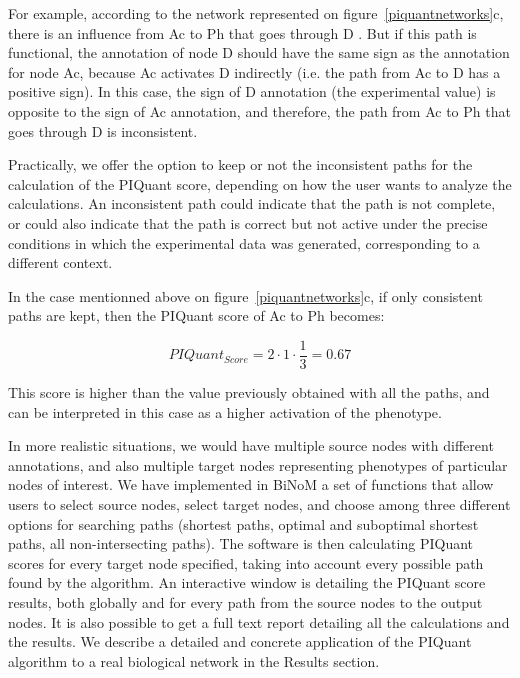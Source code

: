 \documentclass[10pt]{bmc_article}
\newenvironment{bmcformat}{\baselineskip20pt\sloppy\setboolean{publ}{false}}{\baselineskip20pt\sloppy}
\begin{document}
\begin{bmcformat}
For example, according to the network represented on figure~\ref{piquantnetworks}c, there is an influence from Ac to Ph
that goes through D . But if this path
is functional, the annotation of node D should have the same sign as the annotation for node Ac, because
Ac activates D indirectly (i.e. the path from Ac to D has a positive sign). In this case, the sign of D annotation (the experimental value) is opposite to
the sign of Ac annotation, and therefore, the path from Ac to Ph that goes through D is inconsistent.

Practically, we offer the option to
keep or not the inconsistent paths for the calculation of the PIQuant score,
depending on how the user wants to analyze the calculations. An inconsistent
path could indicate that the path is not complete, or could also indicate that
the path is correct but not active under the precise conditions in which the
experimental data was generated, corresponding to a different context.

In the case mentionned above on figure~\ref{piquantnetworks}c, if only consistent paths are kept, then the PIQuant score of Ac to Ph
becomes:

$$
 PIQuant_{Score} = 2 \cdot 1 \cdot \frac{1}{3} = 0.67
$$

This score is higher than the value previously obtained with all the paths, and can be interpreted in this case as a higher activation of the phenotype.

In more realistic situations, we would have multiple source nodes with different
 annotations, and also multiple target nodes representing phenotypes of
particular nodes of interest. We have implemented in BiNoM a set of functions
that allow users to select source nodes, select target nodes, and choose among
three different options for searching paths (shortest paths, optimal and
suboptimal shortest paths, all non-intersecting paths). The software is then
calculating PIQuant scores for every target node specified, taking into account
every possible path found by the algorithm. An interactive window is detailing
the PIQuant score results, both globally and for every path from the source
nodes to the output nodes. It is also possible to get a full text report
detailing all the calculations and the results. We describe a detailed
and concrete application of the PIQuant algorithm to a real biological network
in the Results section.


\end{bmcformat}
\end{document}
